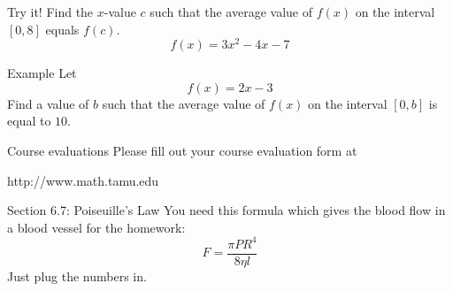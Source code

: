\documentclass[t]{beamer}
\begin{document}
\begin{frame}{Try it!}
Find the $x$-value $c$ such that the average value of $f(x)$
on the interval $[0,8]$ equals $f(c)$.
$$f(x) = 3x^2 - 4x - 7$$
\end{frame}

\begin{frame}{Example}
Let 
$$f(x) = 2x - 3 $$
Find a value of $b$ such that the average value of $f(x)$ on the interval $[0,b]$
is equal to $10$.
\end{frame}

\begin{frame}{Course evaluations}
Please fill out your course evaluation form at

http://www.math.tamu.edu
\end{frame}

\begin{frame}{Section 6.7: Poiseuille's Law}
You need this formula which gives the blood flow 
in a blood vessel for the homework:
$$F = \frac{\pi P R^4}{8 \eta l}$$
Just plug the numbers in.
\end{frame}
\end{document}

